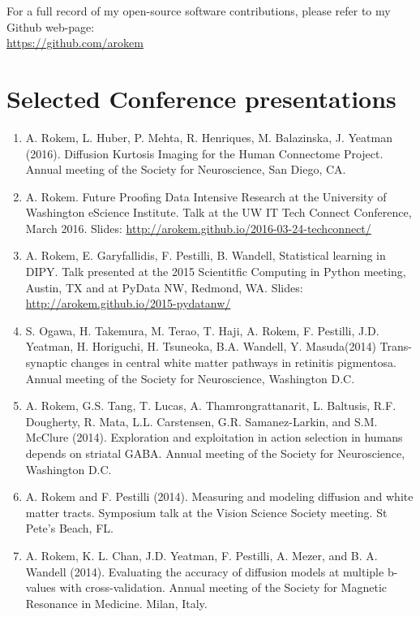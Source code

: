 \documentclass[11pt,fullpage]{article}
\begin{document}
For a full record of my open-source software contributions, please refer to my
Github web-page: \\ \url{https://github.com/arokem}

\section*{Selected Conference presentations}
\begin{enumerate}

\item A. Rokem, L. Huber, P. Mehta, R. Henriques, M. Balazinska, J. Yeatman (2016). Diffusion Kurtosis Imaging for the Human Connectome Project. Annual meeting of the Society for Neuroscience, San Diego, CA.

\item A. Rokem. Future Proofing Data Intensive Research at the University of Washington eScience Institute. Talk at the UW IT Tech Connect Conference, March 2016. Slides: \url{http://arokem.github.io/2016-03-24-techconnect/}

\item A. Rokem, E. Garyfallidis, F. Pestilli, B. Wandell, Statistical learning in DIPY. Talk presented at the 2015 Scientitfic Computing in Python meeting, Austin, TX and at PyData NW, Redmond, WA. Slides: \url{http://arokem.github.io/2015-pydatanw/}

\item S. Ogawa, H. Takemura, M. Terao, T. Haji, A. Rokem, F. Pestilli, J.D. Yeatman, H. Horiguchi, H. Tsuneoka, B.A. Wandell, Y. Masuda(2014) Trans-synaptic changes in central white matter pathways in retinitis pigmentosa. Annual meeting of the Society for Neuroscience, Washington D.C.

\item A. Rokem, G.S. Tang, T. Lucas, A. Thamrongrattanarit, L. Baltusis, R.F. Dougherty, R. Mata, L.L. Carstensen, G.R. Samanez-Larkin, and S.M. McClure (2014). Exploration and exploitation in action selection in humans depends on striatal GABA. Annual meeting of the Society for Neuroscience, Washington D.C.

\item A. Rokem and F. Pestilli (2014). Measuring and modeling diffusion and white matter tracts. Symposium talk at the Vision Science Society meeting. St Pete's Beach, FL.

\item A. Rokem, K. L. Chan, J.D. Yeatman, F. Pestilli, A. Mezer, and B. A. Wandell (2014). Evaluating the accuracy of diffusion models at multiple b-values with cross-validation. Annual meeting of the Society for Magnetic Resonance in Medicine. Milan, Italy.


\end{enumerate}
\end{document}
